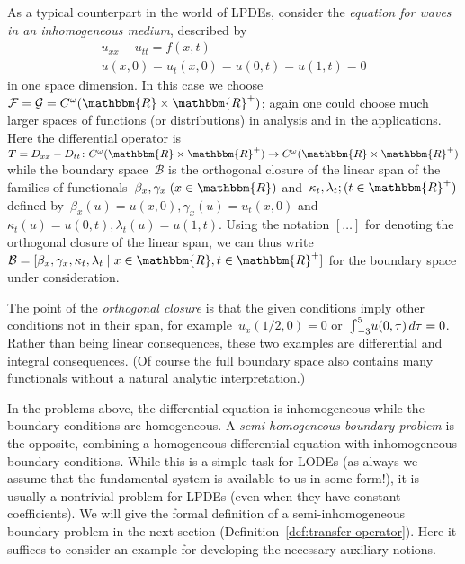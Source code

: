 \documentclass[a4paper]{llncs}
\let\mathbb\mathbbm
\newcommand{\RR}{\mathbb{R}}
\newcommand{\der}{D}
\newcommand{\cum}{{\textstyle \varint}}
\newcommand{\galg}{\mathcal{F}}
\newcommand{\ogalg}{\mathcal{G}}
\newcommand{\bspc}{\mathcal{B}}
\newcommand{\bvp}[2]{\boxed{\begin{array}{l}#1\\#2\end{array}}}
\begin{document}
\begin{myexample}
  \label{ex:wave-inhom-medium}
  As a typical counterpart in the world of LPDEs, consider the
  \emph{equation for waves in an inhomogeneous medium}, described by
\begin{equation*}
    \bvp{u_{xx}-u_{tt} = f(x,t)}{u(x,0) = u_t(x,0) = u(0,t) = u(1,t) = 0}
  \end{equation*}
in one space dimension. In this case we choose~$\galg = \ogalg = C^\omega(\RR
  \times \RR^+)$; again one could choose much larger spaces of functions (or
  distributions) in analysis and in the applications. Here the differential
  operator is~$T = \der_{xx}-\der_{tt}\colon C^\omega(\RR \times \RR^+) \to
  C^\omega(\RR \times \RR^+)$ while the boundary space~$\bspc$ is the orthogonal
  closure of the linear span of the families of functionals~$\beta_x, \gamma_x
  \; (x \in \RR)$ and~$\kappa_t, \lambda_t ; (t \in \RR^+)$ defined
  by~$\beta_x(u) = u(x,0), \gamma_x(u) = u_t(x,0)$ and~$\kappa_t(u) = u(0,t),
  \lambda_t(u) = u(1,t)$. Using the notation $[\dots]$ for denoting the
  orthogonal closure of the linear span, we can thus write~$\mathcal{B} =
  [\beta_x, \gamma_x, \kappa_t, \lambda_t \mid x \in \RR, t \in \RR^+]$ for the
  boundary space under consideration.

  The point of the \emph{orthogonal closure} is that the given conditions imply
  other conditions not in their span, for example~$u_x(1/2,0) = 0$
  or~$\smash{\cum_{-3}^{5}} u(0,\tau) \, d\tau = 0$. Rather than being linear
  consequences, these two examples are differential and integral
  consequences. (Of course the full boundary space also contains many
  functionals without a natural analytic interpretation.)
\end{myexample}

In the problems above, the differential equation is inhomogeneous while the
boundary conditions are homogeneous. A \emph{semi-homogeneous boundary problem}
is the opposite, combining a homogeneous differential equation with
inhomogeneous boundary conditions. While this is a simple task for LODEs (as
always we assume that the fundamental system is available to us in some form!),
it is usually a nontrivial problem for LPDEs (even when they have constant
coefficients). We will give the formal definition of a semi-inhomogeneous
boundary problem in the next section
(Definition~\ref{def:transfer-operator}). Here it suffices to consider an
example for developing the necessary auxiliary notions.
\end{document}
